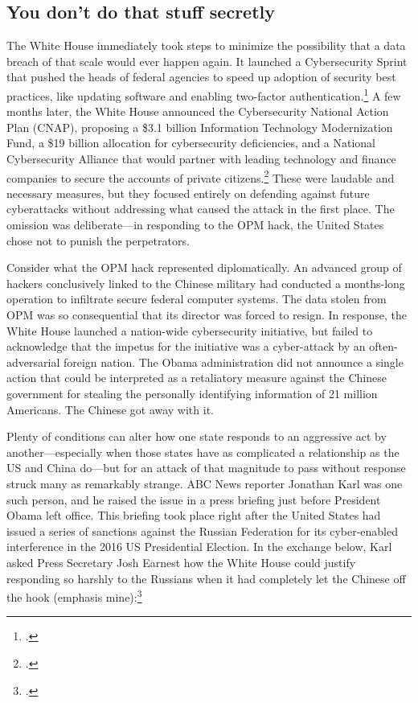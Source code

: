 \documentclass{memoir}
\begin{document}
\begin{refsegment}
\subsection{You don't do that stuff secretly}
The White House immediately took steps to minimize the possibility that a data breach of that scale would ever happen again. It launched a Cybersecurity Sprint that pushed the heads of federal agencies to speed up adoption of security best practices, like updating software and enabling two-factor authentication.\footcite{koerner_inside_2016} A few months later, the White House announced the Cybersecurity National Action Plan (CNAP), proposing a \$3.1 billion Information Technology Modernization Fund, a \$19 billion allocation for cybersecurity deficiencies, and a National Cybersecurity Alliance that would partner with leading technology and finance companies to secure the accounts of private citizens.\footcite{the_white_house_fact_2016} These were laudable and necessary measures, but they focused entirely on defending against future cyberattacks without addressing what caused the attack in the first place. The omission was deliberate---in responding to the OPM hack, the United States chose not to punish the perpetrators.

Consider what the OPM hack represented diplomatically. An advanced group of hackers conclusively linked to the Chinese military had conducted a months-long operation to infiltrate secure federal computer systems. The data stolen from OPM was so consequential that its director was forced to resign. In response, the White House launched a nation-wide cybersecurity initiative, but failed to acknowledge that the impetus for the initiative was a cyber-attack by an often-adversarial foreign nation. The Obama administration did not announce a single action that could be interpreted as a retaliatory measure against the Chinese government for stealing the personally identifying information of 21 million Americans. The Chinese got away with it.

Plenty of conditions can alter how one state responds to an aggressive act by another---especially when those states have as complicated a relationship as the US and China do---but for an attack of that magnitude to pass without response struck many as remarkably strange. ABC News reporter Jonathan Karl was one such person, and he raised the issue in a press briefing just before President Obama left office. This briefing took place right after the United States had issued a series of sanctions against the Russian Federation for its cyber-enabled interference in the 2016 US Presidential Election. In the exchange below, Karl asked Press Secretary Josh Earnest how the White House could justify responding so harshly to the Russians when it had completely let the Chinese off the hook (emphasis mine):\footcite[You can watch the full exchange via video here. It's pretty awkward.]{gill_earnest_2017}


\end{refsegment}
\end{document}

